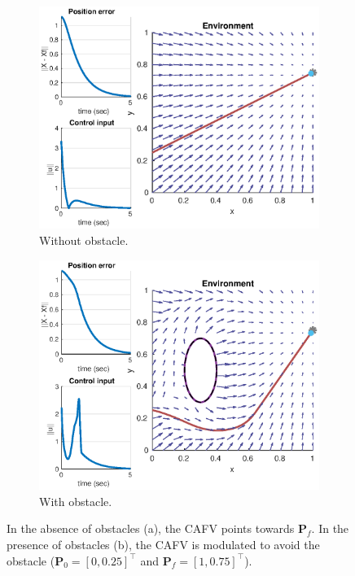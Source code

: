 \begin{figure}[ht!]
\centering
\begin{subfigure}{0.49\linewidth}
\includegraphics[width=\linewidth]{img/ellipse_intro_no_obstacle.eps}
\caption{Without obstacle.}
\end{subfigure}
\begin{subfigure}{0.49\linewidth}
\includegraphics[width=\linewidth]{img/ellipse_intro_with_obstacle.eps}
\caption{With obstacle.}
\end{subfigure}
\caption{In the absence of obstacles (a), the CAFV points towards $\bm{P}_f$. In the presence of obstacles (b), the CAFV is modulated to avoid the obstacle ($\bm{P}_0 = [0,0.25]^\top$ and $\bm{P}_f = [1,0.75]^\top$).}
\label{fig:CAVF_design}
\end{figure}

